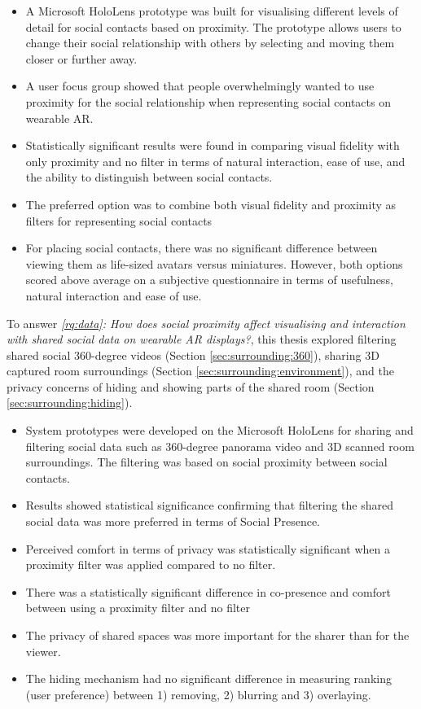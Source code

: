 \begin{itemize}
    \item{A Microsoft HoloLens prototype was built for visualising different levels of detail for social contacts based on proximity. The prototype allows users to change their social relationship with others by selecting and moving them closer or further away.}
    \item{A user focus group showed that people overwhelmingly wanted to use proximity for the social relationship when representing social contacts on wearable AR.}
    \item{Statistically significant results were found in comparing visual fidelity with only proximity and no filter in terms of natural interaction, ease of use, and the ability to distinguish between social contacts.}
    \item{The preferred option was to combine both visual fidelity and proximity as filters for representing social contacts}
    \item{For placing social contacts, there was no significant difference between viewing them as life-sized avatars versus miniatures. However, both options scored above average on a subjective questionnaire in terms of usefulness, natural interaction and ease of use.}
\end{itemize}

\noindent
To answer \textit{\ref{rq:data}: How does social proximity affect visualising and interaction with shared social data on wearable AR displays?}, this thesis explored filtering shared social 360-degree videos (Section \ref{sec:surrounding:360}), sharing 3D captured room surroundings (Section \ref{sec:surrounding:environment}), and the privacy concerns of hiding and showing parts of the shared room (Section \ref{sec:surrounding:hiding}). 

\begin{itemize}
    \item{System prototypes were developed on the Microsoft HoloLens for sharing and filtering social data such as 360-degree panorama video and 3D scanned room surroundings. The filtering was based on social proximity between social contacts.}
    \item{Results showed statistical significance confirming that filtering the shared social data was more preferred in terms of Social Presence.}
    \item{Perceived comfort in terms of privacy was statistically significant when a proximity filter was applied compared to no filter.}
    \item{There was a statistically significant difference in co-presence and comfort between using a proximity filter and no filter}
    \item{The privacy of shared spaces was more important for the sharer than for the viewer.}
    \item{The hiding mechanism had no significant difference in measuring ranking (user preference) between 1) removing, 2) blurring and 3) overlaying.}
\end{itemize}

